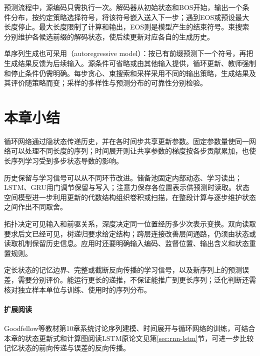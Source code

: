 预测流程中，源编码只需执行一次。解码器从初始状态和BOS开始，输出一个条件分布，按约定策略选择符号，将该符号嵌入送入下一步；遇到EOS或预设最大长度停止。最大长度限制了计算和输出，EOS则是模型产生的结束符号。束搜索分别维护各候选前缀的解码状态，使后续更新对应各自的生成历史。

单序列生成也可采用（autoregressive model）：按已有前缀预测下一个符号，再把生成结果反馈为后续输入。源条件可省略或由其他输入提供，循环更新、教师强制和停止条件仍需明确。每步贪心、束搜索和采样采用不同的输出策略，生成结果及其评价随策略而变；采样的多样性与预测分布的可靠性分别检验。

\FloatBarrier
\section{本章小结}
\label{sec:rnn-summary}

循环网络通过隐状态传递历史，并在各时间步共享更新参数。固定参数量使同一网络可以处理不同长度的序列；时间展开则让共享参数的梯度按各步贡献累加，也使长序列学习受到多步状态导数的影响。

历史保留与学习信号可以从不同环节改进。储备池固定内部动态、学习读出；LSTM、GRU用门调节保留与写入；注意力保存各位置表示供预测时读取。状态空间模型进一步利用更新的代数结构组织卷积或扫描，在整段计算与逐步维护状态之间作出不同取舍。

拓扑决定可见输入和前驱关系，深度决定同一位置经历多少次表示变换。双向读取要求后文已经可见，树递归要求给定结构；跨层连接改善层间通路，仍须由状态或读取机制保留历史信息。应用时还要明确输入编码、监督位置、输出含义和状态重置规则。

定长状态的记忆边界、完整或截断反向传播的学习信号，以及新序列上的预测误差，需要分别评价。能运行更长的递推，不保证能推广到更长序列；泛化判断还需核对独立样本单位与训练、使用时的序列分布。

\paragraph{扩展阅读}
Goodfellow等教材第10章系统讨论序列建模、时间展开与循环网络的训练，可结合本章的状态更新式和计算图阅读LSTM原论文见第\ref{sec:rnn-lstm}节，可进一步比较记忆状态的前向传递与误差的反向传播。
